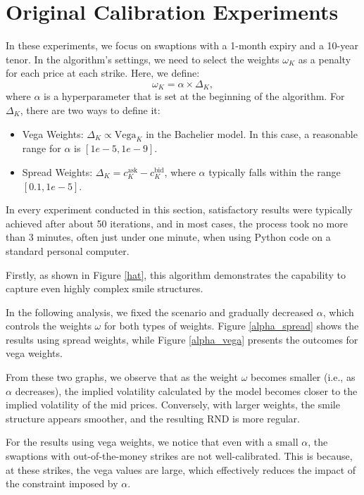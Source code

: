 \section{Original Calibration Experiments}
In these experiments, we focus on swaptions with a 1-month expiry and a 10-year tenor.
In the algorithm's settings, we need to select the weights \(\omega_{K}\) as a penalty for each price at each strike. Here, we define:
\[
\omega_{K} = \alpha \times \Delta_{K},
\]
where \(\alpha\) is a hyperparameter that is set at the beginning of the algorithm. For \(\Delta_{K}\), there are two ways to define it:
\begin{itemize}
    \item Vega Weights: \(\Delta_{K} \propto \text{Vega}_{K}\) in the Bachelier model. In this case, a reasonable range for \(\alpha\) is \([1e-5, 1e-9]\).
    \item Spread Weights: \(\Delta_{K} = c^{\text{ask}}_{K} - c^{\text{bid}}_{K}\), where \(\alpha\) typically falls within the range \([0.1, 1e-5]\).
\end{itemize}
In every experiment conducted in this section, satisfactory results were typically achieved after about 50 iterations, 
and in most cases, the process took no more than 3 minutes, often just under one minute, 
when using Python code on a standard personal computer.

Firstly, as shown in Figure \ref{hat}, this algorithm demonstrates the capability to capture even highly complex smile structures.

In the following analysis, we fixed the scenario and gradually decreased \(\alpha\), which controls the weights \(\omega\) 
for both types of weights. Figure \ref{alpha_spread} shows the results using spread weights, while Figure \ref{alpha_vega} 
presents the outcomes for vega weights.

From these two graphs, we observe that as the weight \(\omega\) becomes smaller (i.e., as \(\alpha\) decreases), 
the implied volatility calculated by the model becomes closer to the implied volatility of the mid prices. 
Conversely, with larger weights, the smile structure appears smoother, and the resulting RND is more regular.

For the results using vega weights, we notice that even with a small \(\alpha\), the swaptions with out-of-the-money 
strikes are not well-calibrated. This is because, at these strikes, the vega values are large, which effectively 
reduces the impact of the constraint imposed by \(\alpha\).

